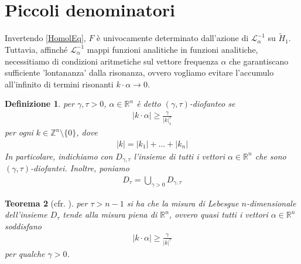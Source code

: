 \documentclass[twoside, 11pt]{amsbook}
\newcommand{\0}{{(0)}}
\newcommand{\3}{{(3)}}
\theoremstyle{colonplain}
\newtheorem{thm}{Teorema}[chapter]
\theoremstyle{colondefinition}
\newtheorem{defn}[thm]{Definizione}
\theoremstyle{colonremark}
\numberwithin{equation}{chapter}
\begin{document}
\section{Piccoli denominatori}
Invertendo \eqref{HomolEq}, $F$ è univocamente determinato dall'azione di $\mathcal{L}^{-1}_\alpha$ su $\tilde{H}_1$. Tuttavia, affinché $\mathcal{L}^{-1}_\alpha$ mappi funzioni analitiche in funzioni analitiche, necessitiamo di condizioni aritmetiche sul vettore frequenza $\alpha$ che garantiscano sufficiente 'lontananza' dalla risonanza, ovvero vogliamo evitare l'accumulo all'infinito di termini risonanti $k \cdot \alpha \rightarrow 0$.
\begin{defn} per $\gamma, \tau > 0$, $\alpha \in \mathbb{R}^n$ è detto $(\gamma, \tau)$-\textit{diofanteo} se 
\begin{align}
    |k \cdot \alpha| \geq \frac{\gamma}{|k|^\tau_1}
\end{align}
per ogni $k \in \mathbb{Z}^n \setminus \{0\}$, dove
\begin{align}
    |k| = |k_1| + \dots + |k_n|
\end{align}
In particolare, indichiamo con $D_{\gamma, \tau}$ l'insieme di tutti i vettori $\alpha \in \mathbb{R}^n$ che sono $(\gamma, \tau)$-diofantei. Inoltre, poniamo
\begin{align}\label{Diofant}
    D_\tau = \bigcup_{\gamma > 0}D_{\gamma, \tau}
\end{align}
\end{defn}
\begin{thm}[cfr. \cite{Poschel}]\label{DiofSubsetFullMeasure} per $\tau > n - 1$ si ha che la misura di Lebesgue $n$-dimensionale dell'insieme $D_\tau$ tende alla misura piena di $\mathbb{R}^n$, ovvero quasi tutti i vettori $\alpha \in \mathbb{R}^n$ soddisfano
\begin{align}
    |k \cdot \alpha| \geq \frac{\gamma}{|k|^\tau}
\end{align}
per qualche $\gamma > 0$.
\end{thm}
\end{document}
